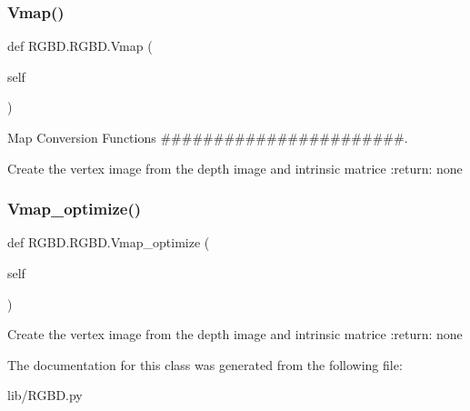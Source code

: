 \subsubsection{Vmap()}
{\footnotesize\ttfamily def R\+G\+B\+D.\+R\+G\+B\+D.\+Vmap (\begin{DoxyParamCaption}\item[{}]{self }\end{DoxyParamCaption})}



Map Conversion Functions \#\#\#\#\#\#\#\#\#\#\#\#\#\#\#\#\#\#\#\#\#\#\#. 

\begin{DoxyVerb}Create the vertex image from the depth image and intrinsic matrice
:return: none
\end{DoxyVerb}
 \mbox{\label{class_r_g_b_d_1_1_r_g_b_d_a2686c0b37c9c4cf8a650656680402797}} 
\subsubsection{Vmap\+\_\+optimize()}
{\footnotesize\ttfamily def R\+G\+B\+D.\+R\+G\+B\+D.\+Vmap\+\_\+optimize (\begin{DoxyParamCaption}\item[{}]{self }\end{DoxyParamCaption})}

\begin{DoxyVerb}Create the vertex image from the depth image and intrinsic matrice
:return: none
\end{DoxyVerb}
 

The documentation for this class was generated from the following file\+:\begin{DoxyCompactItemize}
\item 
lib/R\+G\+B\+D.\+py\end{DoxyCompactItemize}
